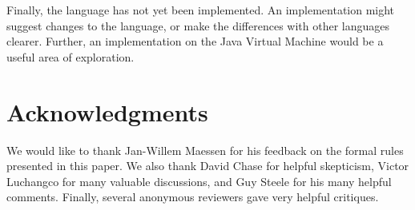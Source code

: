 \documentclass[10pt]{acm-sigplan}
\begin{document}
Finally, the language has not yet been implemented.  An implementation
might suggest changes to the language, or make the differences with
other languages clearer.  Further, an implementation on the Java
Virtual Machine would be a useful area of exploration.

\section*{Acknowledgments}

We would like to thank Jan-Willem Maessen for his 
feedback on the formal rules presented in this paper.  We also thank
David Chase for helpful skepticism, Victor
Luchangco for many valuable discussions, and Guy Steele for his many
helpful comments.  Finally, several anonymous reviewers gave very
helpful critiques.  




\end{document}
